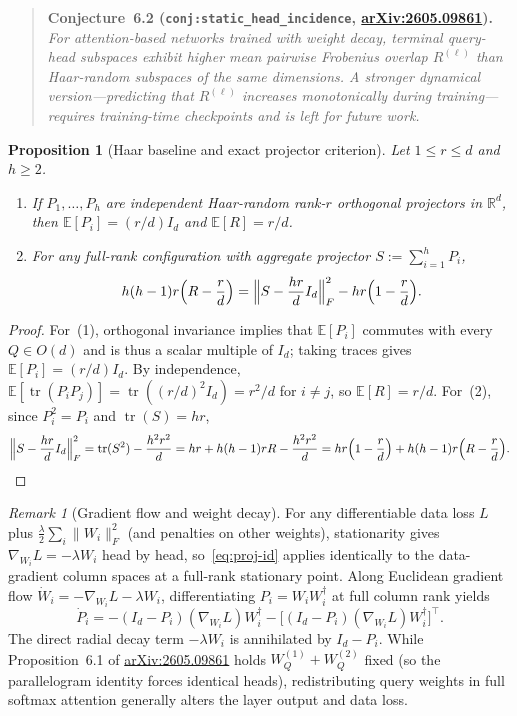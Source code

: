 \documentclass[11pt]{article}
\theoremstyle{plain}
\newtheorem{proposition}[theorem]{Proposition}
\theoremstyle{definition}
\theoremstyle{remark}
\newtheorem{remark}{Remark}
\DeclareMathOperator{\tr}{tr}
\begin{document}
\begin{quote}
\textbf{Conjecture~6.2 (\texttt{conj:static\_head\_incidence}, \href{https://arxiv.org/abs/2605.09861}{arXiv:2605.09861}).}
\emph{For attention-based networks trained with weight decay, terminal query-head subspaces exhibit higher mean pairwise Frobenius overlap $R^{(\ell)}$ than Haar-random subspaces of the same dimensions. A stronger dynamical version---predicting that $R^{(\ell)}$ increases monotonically during training---requires training-time checkpoints and is left for future work.}
\end{quote}

\begin{proposition}[Haar baseline and exact projector criterion]\label{prop:projector}
Let $1 \le r \le d$ and $h \ge 2$.
\begin{enumerate}[label=\textup{(\arabic*)}]
\item If $P_1, \dots, P_h$ are independent Haar-random rank-$r$ orthogonal projectors in $\mathbb{R}^d$, then $\mathbb{E}[P_i] = (r/d)I_d$ and $\mathbb{E}[R] = r/d$.
\item For any full-rank configuration with aggregate projector $S := \sum_{i=1}^h P_i$,
\begin{equation}\label{eq:proj-id}
h(h-1)r\Bigl(R - \frac{r}{d}\Bigr) = \Bigl\|S - \frac{hr}{d}I_d\Bigr\|_F^2 - hr\Bigl(1 - \frac{r}{d}\Bigr).
\end{equation}
\end{enumerate}
\end{proposition}

\begin{proof}
For~(1), orthogonal invariance implies that $\mathbb{E}[P_i]$ commutes with every $Q \in O(d)$ and is thus a scalar multiple of $I_d$; taking traces gives $\mathbb{E}[P_i] = (r/d)I_d$. By independence, $\mathbb{E}[\tr(P_i P_j)] = \tr((r/d)^2 I_d) = r^2/d$ for $i \neq j$, so $\mathbb{E}[R] = r/d$.
For~(2), since $P_i^2 = P_i$ and $\tr(S) = hr$,
\[
\Bigl\|S - \frac{hr}{d}I_d\Bigr\|_F^2
= \tr(S^2) - \frac{h^2 r^2}{d}
= hr + h(h-1)r R - \frac{h^2 r^2}{d}
= hr\Bigl(1 - \frac{r}{d}\Bigr) + h(h-1)r\Bigl(R - \frac{r}{d}\Bigr).\qedhere
\]
\end{proof}

\begin{remark}[Gradient flow and weight decay]
For any differentiable data loss $L$ plus $\frac{\lambda}{2}\sum_i \|W_i\|_F^2$ (and penalties on other weights), stationarity gives $\nabla_{W_i} L = -\lambda W_i$ head by head, so~\eqref{eq:proj-id} applies identically to the data-gradient column spaces at a full-rank stationary point. Along Euclidean gradient flow $\dot{W}_i = -\nabla_{W_i} L - \lambda W_i$, differentiating $P_i = W_i W_i^\dagger$ at full column rank yields
\[
\dot{P}_i = -(I_d - P_i)(\nabla_{W_i} L)W_i^\dagger - \bigl[(I_d - P_i)(\nabla_{W_i} L)W_i^\dagger\bigr]^\top.
\]
The direct radial decay term $-\lambda W_i$ is annihilated by $I_d - P_i$. While Proposition~6.1 of \href{https://arxiv.org/abs/2605.09861}{arXiv:2605.09861} holds $W_Q^{(1)} + W_Q^{(2)}$ fixed (so the parallelogram identity forces identical heads), redistributing query weights in full softmax attention generally alters the layer output and data loss.
\end{remark}
\end{document}
